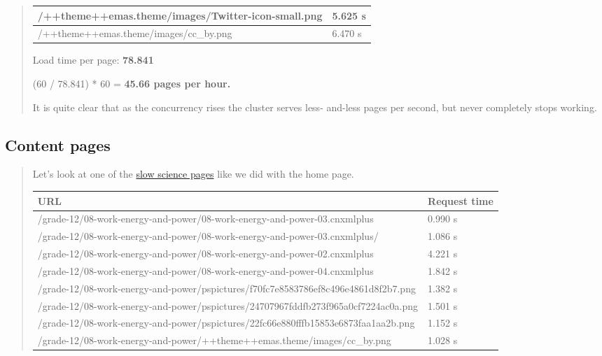 \documentclass[letterpaper,10pt,english]{sphinxmanual}
\begin{document}
\begin{quote}
\begin{tabulary}{\linewidth}{|L|L|}
/++theme++emas.theme/images/Twitter-icon-small.png
 & 
5.625 s
\\\hline

/++theme++emas.theme/images/cc\_by.png
 & 
6.470 s
\\\hline
\end{tabulary}


Load time per page: \textbf{78.841}

(60 / 78.841) * 60 = \textbf{45.66 pages per hour.}

It is quite clear that as the concurrency rises the cluster serves less-
and-less pages per second, but never completely stops working.
\end{quote}


\subsection{Content pages}
\label{index:content-pages}\begin{quote}

Let's look at one of the \href{http://197.221.50.101/stats/test\_AuthenticatedRead-20130822T143507/\#page-013-get-grade-12-08-work-energy-and-power-08-work-energy-and-power-03-cnxmlplus}{slow science pages} like we did with the home
page.

\begin{tabulary}{\linewidth}{|L|L|}
\hline
\textbf{\relax 
URL
} & \textbf{\relax 
Request time
}\\\hline

/grade-12/08-work-energy-and-power/08-work-energy-and-power-03.cnxmlplus
 & 
0.990 s
\\\hline

/grade-12/08-work-energy-and-power/08-work-energy-and-power-03.cnxmlplus/
 & 
1.086 s
\\\hline

/grade-12/08-work-energy-and-power/08-work-energy-and-power-02.cnxmlplus
 & 
4.221 s
\\\hline

/grade-12/08-work-energy-and-power/08-work-energy-and-power-04.cnxmlplus
 & 
1.842 s
\\\hline

/grade-12/08-work-energy-and-power/pspictures/f70fc7e8583786ef8c496e4861d8f2b7.png
 & 
1.382 s
\\\hline

/grade-12/08-work-energy-and-power/pspictures/24707967fddfb273f965a0cf7224ac0a.png
 & 
1.501 s
\\\hline

/grade-12/08-work-energy-and-power/pspictures/22fc66e880fffb15853e6873faa1aa2b.png
 & 
1.152 s
\\\hline

/grade-12/08-work-energy-and-power/++theme++emas.theme/images/cc\_by.png
 & 
1.028 s
\\\hline
\end{tabulary}

\end{quote}
\end{document}
